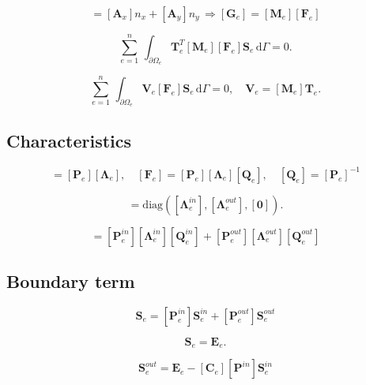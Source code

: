 \documentclass[11pt,A4paper]{book}
\newcommand{\ds}{\displaystyle}
\newcommand{\tb}{\textbf}
\newcommand{\tr}{\textrm}
\newcommand{\bs}{\boldsymbol}
\newcommand{\tp}{^T}
\newcommand{\esp}{, \quad}
\newcommand{\p}{\partial}
\renewcommand{\d}{\,\textrm{d}}
\renewcommand{\:}{\tb{:}}
\begin{document}
\begin{equation}
	[\tb{F}_e]=[\tb{A}_x]n_x + [\tb{A}_y]n_y \,\Longrightarrow
	[\tb{G}_e]=[\tb{M}_e][\tb{F}_e]
\end{equation}

\begin{equation}
\ds{\sum_{e=1}^n}\,\ds{\int_{\p\Omega_e}} 
\tb{T}_e\tp[\tb{M}_e][\tb{F}_e]\tb{S}_e \d\Gamma
={0}. 
\end{equation}

\begin{equation}
\ds{\sum_{e=1}^n}\,\ds{\int_{\p\Omega_e}} 
\tb{V}_e [\tb{F}_e]\tb{S}_e \d\Gamma
={0} \esp \tb{V}_e=[\tb{M}_e]\tb{T}_e. 
\end{equation}


\subsection{Characteristics}




\begin{equation}
	[\tb{F}_e][\tb{P}_e]=[\tb{P}_e][\bs{\Lambda}_e] \esp 
	[\tb{F}_e]=[\tb{P}_e][\bs{\Lambda}_e][\tb{Q}_e] \esp
	[\tb{Q}_e]=[\tb{P}_e]^{-1}
\end{equation}

\begin{equation}
[\bs{\Lambda}_e]=\tr{diag}([\bs{\Lambda}_e^{in}],[\bs{\Lambda}_e^{out}],[\tb{0}]).	
\end{equation}



\begin{equation}
	[\tb{F}_e]=[\tb{P}^{in}_e][\bs{\Lambda}^{in}_e][\tb{Q}^{in}_e]+[\tb{P}^{out}_e][\bs{\Lambda}^{out}_e][\tb{Q}^{out}_e]
\end{equation}

\subsection{Boundary term}




\begin{equation}
	\tb{S}_e=[\tb{P}^{in}_e]\tb{S}_e^{in}+[\tb{P}^{out}_e]\tb{S}_e^{out}
\end{equation}

\begin{equation}
	[\tb{C}_e]\tb{S}_e=\tb{E}_e.
\end{equation}


\begin{equation}
	[\tb{C}_e][\tb{P}^{out}]\tb{S}_e^{out}=\tb{E}_e-[\tb{C}_e][\tb{P}^{in}]\tb{S}_e^{in}
\end{equation}
\end{document}
